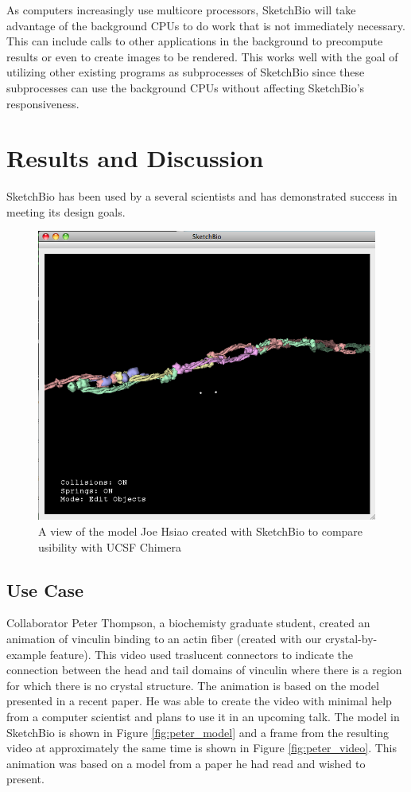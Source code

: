 \documentclass[twocolumn]{bmcart}%
\begin{document}
As computers increasingly use multicore processors, SketchBio will take advantage of the background CPUs to do work that is not immediately necessary.
This can include calls to other applications in the background to precompute results or even to create images to be rendered.
This works well with the goal of utilizing other existing programs as subprocesses of SketchBio since these subprocesses can use the background CPUs without affecting SketchBio's responsiveness.

\section*{Results and Discussion}
SketchBio has been used by a several scientists and has demonstrated success in meeting its design goals.

\begin{figure}[h]
\centering
\includegraphics[width=0.9\columnwidth]{joe_test.png}
\caption{A view of the model Joe Hsiao created with SketchBio to compare usibility with UCSF Chimera}
\label{fig:joe_test}
\end{figure}

\subsection*{Use Case}
Collaborator Peter Thompson, a biochemisty graduate student, created an animation of vinculin binding to an actin fiber (created with our crystal-by-example feature).
This video used traslucent connectors to indicate the connection between the head and tail domains of vinculin where there is a region for which there is no crystal structure.
The animation is based on the model presented in a recent paper.  He was able to create the video with minimal help from a computer scientist and plans to use it in an upcoming talk.
The model in SketchBio is shown in Figure \ref{fig:peter_model} and a frame from the resulting video at approximately the same time is shown in Figure \ref{fig:peter_video}.
This animation was based on a model from a paper he had read and wished to present.
\end{document}
